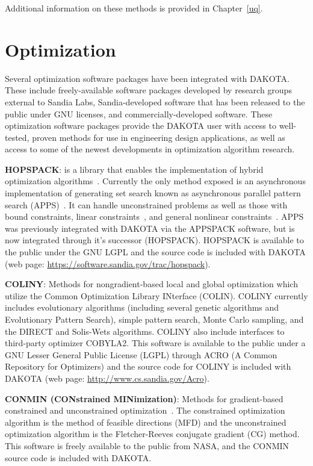 Additional information on these methods is provided in Chapter~\ref{uq}.

\section{Optimization}\label{capabilities:optimization1}

Several optimization software packages have been integrated with
DAKOTA. These include freely-available software packages developed by
research groups external to Sandia Labs, Sandia-developed software
that has been released to the public under GNU licenses, and
commercially-developed software. These optimization software packages
provide the DAKOTA user with access to well-tested, proven methods for
use in engineering design applications, as well as access to some of
the newest developments in optimization algorithm research.

\textbf{HOPSPACK}: is a library that enables the implementation of
hybrid optimization algorithms~\cite{Plantenga2009}.  Currently the
only method exposed is an asynchronous implementation of generating
set search known as asynchronous parallel pattern search
(APPS)~\cite{GrKo06}.  It can handle unconstrained problems as well as
those with bound constraints, linear constraints~\cite{GrKoLe08}, and
general nonlinear constraints~\cite{GrKo07}.  APPS was previously
integrated with DAKOTA via the APPSPACK software, but is now
integrated through it's successor (HOPSPACK).  HOPSPACK is available
to the public under the GNU LGPL and the source code is included with
DAKOTA (web page: \url{https://software.sandia.gov/trac/hopspack}).

\textbf{COLINY}: Methods for nongradient-based local and global
optimization which utilize the Common Optimization Library INterface
(COLIN). %
COLINY currently includes evolutionary algorithms (including several
genetic algorithms and Evolutionary Pattern Search), simple pattern
search, Monte Carlo sampling, and the DIRECT and Solis-Wets
algorithms. COLINY also include interfaces to third-party optimizer
COBYLA2.  This software is available to the public under a GNU Lesser
General Public License (LGPL) through ACRO (A Common Repository for
Optimizers) and the source code for COLINY is included with DAKOTA
(web page: \url{http://www.cs.sandia.gov/Acro}).

\textbf{CONMIN (CONstrained MINimization)}: Methods for gradient-based
constrained and unconstrained optimization~\cite{Van78}. The constrained
optimization algorithm is the method of feasible directions (MFD) and
the unconstrained optimization algorithm is the Fletcher-Reeves
conjugate gradient (CG) method. This software is freely available to
the public from NASA, and the CONMIN source code is included with
DAKOTA.

